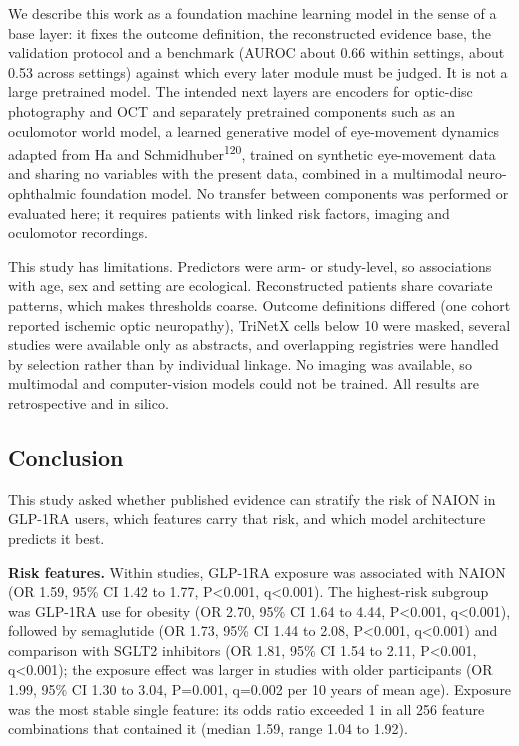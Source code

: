 \documentclass[
  11pt,
]{article}
\begin{document}
We describe this work as a foundation machine learning model in the
sense of a base layer: it fixes the outcome definition, the
reconstructed evidence base, the validation protocol and a benchmark
(AUROC about 0.66 within settings, about 0.53 across settings) against
which every later module must be judged. It is not a large pretrained
model. The intended next layers are encoders for optic-disc photography
and OCT and separately pretrained components such as an oculomotor world
model, a learned generative model of eye-movement dynamics adapted from
Ha and Schmidhuber\textsuperscript{120}, trained on synthetic
eye-movement data and sharing no variables with the present data,
combined in a multimodal neuro-ophthalmic foundation model. No transfer
between components was performed or evaluated here; it requires patients
with linked risk factors, imaging and oculomotor recordings.

This study has limitations. Predictors were arm- or study-level, so
associations with age, sex and setting are ecological. Reconstructed
patients share covariate patterns, which makes thresholds coarse.
Outcome definitions differed (one cohort reported ischemic optic
neuropathy), TriNetX cells below 10 were masked, several studies were
available only as abstracts, and overlapping registries were handled by
selection rather than by individual linkage. No imaging was available,
so multimodal and computer-vision models could not be trained. All
results are retrospective and in silico.

\subsection{Conclusion}\label{conclusion}

This study asked whether published evidence can stratify the risk of
NAION in GLP-1RA users, which features carry that risk, and which model
architecture predicts it best.

\textbf{Risk features.} Within studies, GLP-1RA exposure was associated
with NAION (OR 1.59, 95\% CI 1.42 to 1.77, P\textless0.001,
q\textless0.001). The highest-risk subgroup was GLP-1RA use for obesity
(OR 2.70, 95\% CI 1.64 to 4.44, P\textless0.001, q\textless0.001),
followed by semaglutide (OR 1.73, 95\% CI 1.44 to 2.08, P\textless0.001,
q\textless0.001) and comparison with SGLT2 inhibitors (OR 1.81, 95\% CI
1.54 to 2.11, P\textless0.001, q\textless0.001); the exposure effect was
larger in studies with older participants (OR 1.99, 95\% CI 1.30 to
3.04, P=0.001, q=0.002 per 10 years of mean age). Exposure was the most
stable single feature: its odds ratio exceeded 1 in all 256 feature
combinations that contained it (median 1.59, range 1.04 to 1.92).
\end{document}
